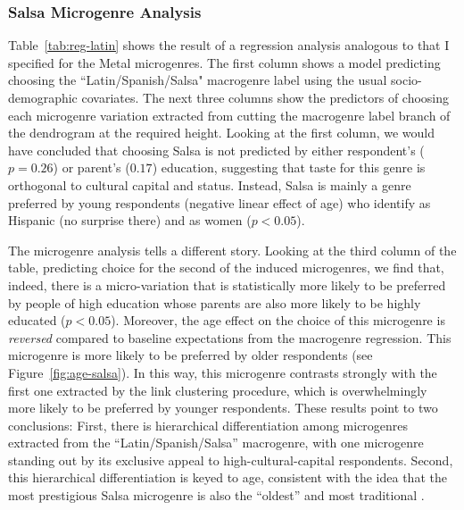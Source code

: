 \documentclass[a4paper,12pt]{extarticle}
\begin{document}
\subsubsection{Salsa Microgenre Analysis}
Table~\ref{tab:reg-latin} shows the result of a regression analysis analogous to that I specified for the Metal microgenres. The first column shows a model predicting choosing the ``Latin/Spanish/Salsa" macrogenre label using the usual socio-demographic covariates. The next three columns show the predictors of choosing each microgenre variation extracted from cutting the macrogenre label branch of the dendrogram at the required height. Looking at the first column, we would have concluded that choosing Salsa is not predicted by either respondent's ($p = 0.26$) or parent's ($0.17$) education, suggesting that taste for this genre is orthogonal to cultural capital and status. Instead, Salsa is mainly a genre preferred by young respondents (negative linear effect of age) who identify as Hispanic (no surprise there) and as women ($p < 0.05$). 

The microgenre analysis tells a different story. Looking at the third column of the table, predicting choice for the second of the induced microgenres, we find that, indeed, there is a micro-variation that is statistically more likely to be preferred by people of high education whose parents are also more likely to be highly educated ($p < 0.05$). Moreover, the age effect on the choice of this microgenre is \textit{reversed} compared to baseline expectations from the macrogenre regression. This microgenre is more likely to be preferred by older respondents (see Figure~\ref{fig:age-salsa}). In this way, this microgenre contrasts strongly with the first one extracted by the link clustering procedure, which is overwhelmingly more likely to be preferred by younger respondents. These results point to two conclusions: First, there is hierarchical differentiation among microgenres extracted from the ``Latin/Spanish/Salsa'' macrogenre, with one microgenre standing out by its exclusive appeal to high-cultural-capital respondents. Second, this hierarchical differentiation is keyed to age, consistent with the idea that the most prestigious Salsa microgenre is also the ``oldest'' and most traditional \citep{Bachmayer2014-pk}.
\end{document}
